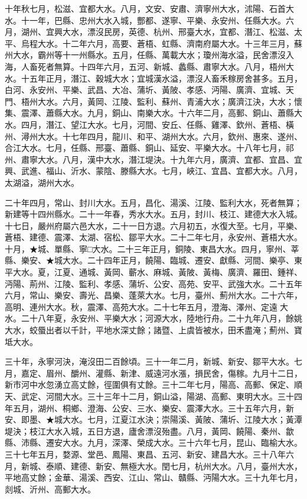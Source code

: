 \begin{pinyinscope}
十年秋七月，松滋、宜都大水。八月，文安、安肅、濟寧州大水，沭陽、石首大水。十一年，巴縣、忠州大水入城，酆都、遂寧、平樂、永安州、任縣大水。六月，湖州、宜興大水，漂沒民房，英德、杭州、邢臺大水，宜都、潛江、松滋、太平、烏程大水。十二年六月，高要、蒼梧、虹縣、濟南府屬大水。十三年三月，蘇州大水，霸州等十一州縣水。五月，任縣、萬載大水；瓊州海水溢，民舍漂沒入海，人畜死者無算。十四年六月，五河、新城、蠡縣、肅寧大水。八月，梧州大水。十五年正月，潛江、穀城大水；宜城漢水溢，漂沒人畜禾稼房舍甚多。五月，白河、永安州、平樂、武昌、大冶、蒲圻、黃陂、孝感、沔陽、廣濟、宜城、天門、梧州大水。六月，黃岡、江陵、監利、蘇州、青浦大水；廣濟江決，大水；懷集、震澤、蕭縣大水。九月，銅山、南樂大水。十六年二月，高郵、銅山、蕭縣大水。四月，潛江、望江大水。七月，河間、安丘、任縣、雞澤、欽州、蒼梧、橫州、潯州大水。十七年四月，龍川、和平、湖州大水。六月，欽州、惠來、遂州、合江大水。七月，任縣、邢臺、蕭縣、銅山、延安、平樂大水。十八年七月，祁州、肅寧大水。八月，漢中大水，潛江堤決。十九年六月，廣濟、宜都、宜昌、宜興、武進、福山、沂水、蒙陰、滕縣大水。七月，峽江、宜昌、宜都大水。八月，太湖溢，湖州大水。

二十年四月，常山、封川大水。五月，昌化、湯溪、江陵、監利大水，死者無算；新建等十四州縣水。二十一年春，秀水大水。五月，封川、枝江、建德大水入城。十七日，嚴州府屬六邑大水，二十一日方退。六月初五，水復大至。七月，平樂、蒼梧、建德、震澤、太湖、宿松、鄒平大水。二十二年七月，永安州、蒼梧大水。十月，★城、單縣、寧□大水。二十三年正月，銅陵、東昌大水。四月，寧州、莘縣、樂安、★城大水。二十四年正月，饒陽、臨城、遷安、獻縣、河間、樂亭、東平大水。夏，江夏、通城、黃岡、蘄水、麻城、黃陂、黃梅、廣濟、羅田、鍾祥、沔陽、荊州、江陵、監利、孝感、蒲圻、公安、高苑、安平、武強大水。二十五年六月，常山、樂安、壽光、昌樂、蓬萊大水。七月，臺州、薊州大水。二十六年，高明、連州大水。秋，震澤、高苑大水。二十七年五月，澄海、澤州、定遠大水。二十八年夏，永安州、平樂大水；河源大水，陸地行舟。二十九年八月，餘姚大水，蛟蜃出者以千計，平地水深丈餘；諸暨、上虞皆被水，田禾盡淹；薊州、寶坻大水。

三十年，永寧河決，淹沒田二百餘頃。三十一年二月，新城、新安、鄒平大水。七月，嘉定、眉州、釂州、灌縣、新津、威遠河水漲，損民舍，傷稼。九月十二日，新市河中水忽湧立高丈餘，徑圍俱有丈餘。三十二年七月，陽高、高郵、保定、順天、武定、河間大水。三十三年十二月，銅山溢，陽湖、高郵、東明大水。三十四年五月，湖州、桐鄉、澄海、公安、三水、樂安、震澤大水。三十五年六月，新安、即墨、★城大水。七月，江夏江水決；崇陽溪、黃陂、蒲圻、江陵大水；黃潭堤決；枝江大水入城，五日方退，廬舍漂沒殆盡。八月，黃岡、饒陽、秦州、歙縣、沛縣、遷安大水。九月，深澤、榮成大水。三十六年七月，昆山、臨榆大水。三十七年五月，婺源、堂邑、鳳陽、東昌、五河、新安、建昌大水。三十八年六月，新城、泰順、建德、新安、無極大水。閏七月，杭州大水。八月，臺州大水，平地高丈餘；金華、湯溪、西安、江山、常山、贛縣、沔陽大水。三十九年七月，剡城、沂州、高郵大水。


\end{pinyinscope}
